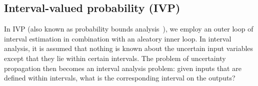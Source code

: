 \subsection{Interval-valued probability (IVP)} \label{adv_models:mixed_uq:ivp}

In IVP (also known as probability bounds
analysis~\cite{ferson,karanki,aughenbaugh}), we employ an outer loop
of interval estimation in combination with an aleatory inner loop.
In interval analysis, it is assumed that nothing is known
about the uncertain input variables except that they lie within
certain intervals.  The problem of uncertainty propagation then
becomes an interval analysis problem: given inputs that are defined
within intervals, what is the corresponding interval on the outputs?

